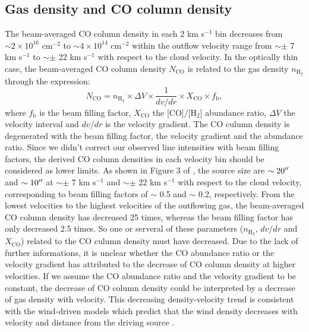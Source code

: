 \subsection{Gas density and CO column density}
The beam-averaged CO column density in each 2 km s$^{-1}$ bin decreases from $\sim 2 \times  10^{16} $ cm$^{-2}$ to $\sim 4 \times 10^{14}$ cm$^{-2}$ within the outflow velocity range from $\sim \pm$ 7 km s$^{-1}$ to $\sim \pm$ 22 km s$^{-1}$ with respect to the cloud velocity. In the optically thin case, the beam-averaged CO column density $N_{\mathrm{CO}}$ is related to the gas density $n_{\mathrm{H}_2}$ through the expression: 
\begin{equation}
N_{\mathrm{CO}} = n_{\mathrm{H}_2} \times \Delta V \times \frac{1}{dv/dr} \times X_{\mathrm{CO}} \times f_{\mathrm{b}}, 
\end{equation}
where $f_{\mathrm{b}}$ is the beam filling factor, $X_{\mathrm{CO}}$ the [CO]/[H$_2$] abundance ratio, $\Delta V$ the velocity interval and $dv/dr$ is the velocity gradient. The CO culumn density is degenerated with the beam filling factor, the velocity gradient and the abundance ratio. Since we didn't correct our observed line intensities with beam filling factors, the derived CO column densities in each velocity bin should be considered as lower limits. As shown in Figure 3 of \citet{2009ApJ...696...66Q}, the source size are $\sim 20\mbox{$^{\prime\prime}$}$ and $\sim 10\mbox{$^{\prime\prime}$}$ at $\sim \pm$ 7 km s$^{-1}$ and $\sim \pm$ 22 km s$^{-1}$ with respect to the cloud velocity, corresponding to beam filling factors of $\sim$ 0.5 and $\sim$ 0.2, respectively.  From the lowest velocities to the highest velocities of the outflowing gas, the beam-averaged CO column density has decreased 25 times, whereas the beam filling factor has only decreased 2.5 times. So one or serveral of these parameters ($n_{\mathrm{H}_2}$, $dv/dr$ and $X_{\mathrm{CO}}$) related to the CO culumn density must have decreased. Due to the lack of further informations, it is unclear whether the CO abundance ratio or the velocity gradient has attributed to the decrease of CO column density at higher velocities. If we assume the CO abundance ratio and the velocity gradient to be constant, the decrease of CO column density could be interpreted by a decrease of gas density with velocity. This decreasing density-velocity trend is consistent with the wind-driven models which predict that the wind density decreases with velocity and distance from the driving source \citep{2007prpl.conf..245A}.
